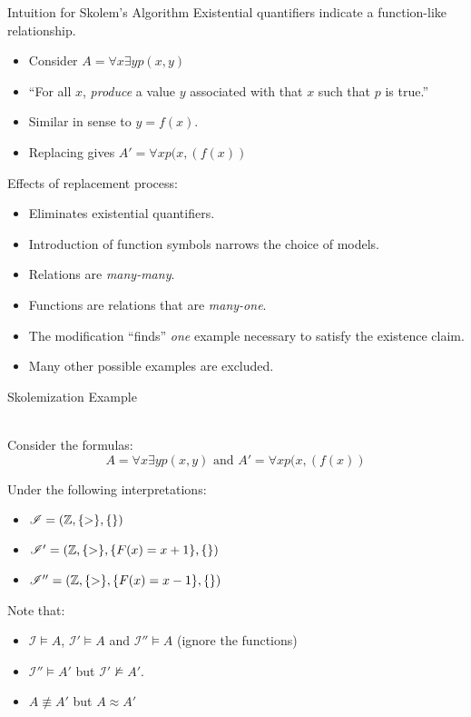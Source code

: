 \documentclass[style=sailor,size=12pt]{powerdot}
\begin{document}
\begin{wideslide}[bm=,toc=]{Intuition for Skolem's Algorithm}
Existential quantifiers indicate a function-like relationship.
\begin{itemize}
\item Consider $A = \forall x \exists y p(x,y)$
\item ``For all $x$, \emph{produce} a value $y$ associated with that $x$ such
that $p$ is true.''
\item Similar in sense to $y = f(x)$.
\item Replacing gives $A' = \forall x p(x,(f(x))$
\end{itemize}
\vspace{2ex}
Effects of replacement process:
\begin{itemize}
\item Eliminates existential quantifiers.
\item Introduction of function symbols narrows the choice of models.
\item Relations are \emph{many-many}.
\item Functions are relations that are \emph{many-one}.
\item The modification ``finds'' \emph{one} example necessary to satisfy the existence claim.
\item Many other possible examples are excluded.
\end{itemize}
\end{wideslide}

\begin{wideslide}[bm=,toc=]{Skolemization Example}
\begin{ex}{9.14}
~\\Consider the formulas:
\vspace{-2ex}
\[A = \forall x \exists y p(x,y) \text{ and } A' = \forall x p(x,(f(x))\]
\end{ex}
\vspace{-2ex}
Under the following interpretations:
\begin{itemize}
\item $\mathcal{I} = (\mathbb{Z},\{>\},\{\})$
\item $\mathcal{I}' = (\mathbb{Z},\{>\},\{F(x) = x + 1\},\{\})$
\item $\mathcal{I}'' = (\mathbb{Z},\{>\},\{F(x) = x - 1\},\{\})$
\end{itemize}
Note that:
\begin{itemize}
\item $\mathcal{I} \models A$, $\mathcal{I}' \models A$ and $\mathcal{I}''
\models A$ (ignore the functions)
\item $\mathcal{I}'' \models A'$ but $\mathcal{I}' \not \models A'$. 
\item $A \not \equiv A'$ but $A \approx A'$ 
\end{itemize}
\end{wideslide}
\end{document}
